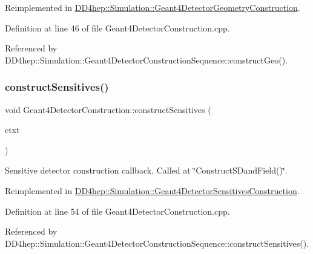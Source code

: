 Reimplemented in \hyperlink{class_d_d4hep_1_1_simulation_1_1_geant4_detector_geometry_construction_ab20b86bfe9009f93ce567ef418e266af}{D\+D4hep\+::\+Simulation\+::\+Geant4\+Detector\+Geometry\+Construction}.



Definition at line 46 of file Geant4\+Detector\+Construction.\+cpp.



Referenced by D\+D4hep\+::\+Simulation\+::\+Geant4\+Detector\+Construction\+Sequence\+::construct\+Geo().

\hypertarget{class_d_d4hep_1_1_simulation_1_1_geant4_detector_construction_a852a3cd581f106a1f8c65122fb517dab}{}\label{class_d_d4hep_1_1_simulation_1_1_geant4_detector_construction_a852a3cd581f106a1f8c65122fb517dab} 
\subsubsection{\texorpdfstring{construct\+Sensitives()}{constructSensitives()}}
{\footnotesize\ttfamily void Geant4\+Detector\+Construction\+::construct\+Sensitives (\begin{DoxyParamCaption}\item[{\hyperlink{class_d_d4hep_1_1_simulation_1_1_geant4_detector_construction_context}{Geant4\+Detector\+Construction\+Context} $\ast$}]{ctxt }\end{DoxyParamCaption})\hspace{0.3cm}{\ttfamily [virtual]}}



Sensitive detector construction callback. Called at \char`\"{}\+Construct\+S\+Dand\+Field()\char`\"{}. 



Reimplemented in \hyperlink{class_d_d4hep_1_1_simulation_1_1_geant4_detector_sensitives_construction_ae698013abe689d2e76e1423d5e08f246}{D\+D4hep\+::\+Simulation\+::\+Geant4\+Detector\+Sensitives\+Construction}.



Definition at line 54 of file Geant4\+Detector\+Construction.\+cpp.



Referenced by D\+D4hep\+::\+Simulation\+::\+Geant4\+Detector\+Construction\+Sequence\+::construct\+Sensitives().



